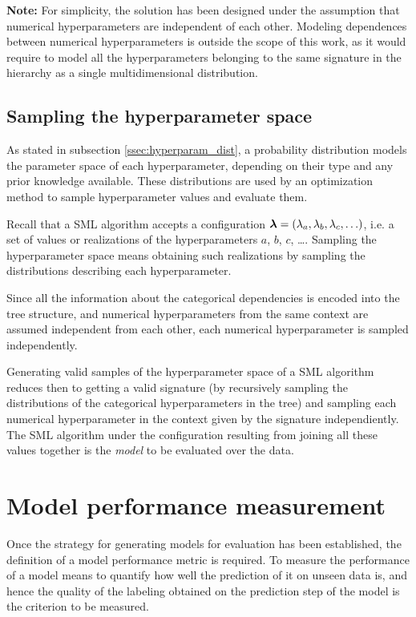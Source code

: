 	{\bf Note:} For simplicity, the solution has been designed under the assumption that numerical
	hyperparameters are independent of each other. Modeling dependences between numerical
	hyperparameters is outside the scope of this work, as it would require to model all the
	hyperparameters belonging to the same signature in the hierarchy as a single multidimensional
	distribution.

	\subsection{Sampling the hyperparameter space}
	\label{ssec:sampling}
	As stated in subsection \ref{ssec:hyperparam_dist}, a probability distribution models the
	parameter space of each hyperparameter, depending on their type and any prior knowledge
	available. These distributions are used by an optimization method to sample hyperparameter
	values and evaluate them.

	Recall that a SML algorithm accepts a configuration $\boldsymbol{\lambda} = (\lambda_a, \lambda_b,
	\lambda_c, \ldots)$, i.e. a set of values or realizations of the hyperparameters $a$, $b$,
	$c$, \ldots. Sampling the hyperparameter space means obtaining such realizations by
	sampling the distributions describing each hyperparameter.

	Since all the information about the categorical dependencies is encoded into the tree structure,
	and numerical hyperparameters from the same context are assumed independent from each other, each
	numerical hyperparameter is sampled independently.
	
	Generating valid samples of the hyperparameter space of a SML algorithm reduces then to getting
	a valid signature (by recursively sampling the distributions of the categorical hyperparameters
	in the tree) and sampling each numerical hyperparameter in the context given by the signature
	independiently. The SML algorithm under the configuration resulting from joining all these
	values together is the \emph{model} to be evaluated over the data.

\section{Model performance measurement}
	\label{sec:performance_measurement}
	
	Once the strategy for generating models for evaluation has been established, the definition of a
	model performance metric is required. To measure the performance of a model means to quantify
	how well the prediction of it on unseen data is, and hence the quality of the labeling obtained
	on the prediction step of the model is the criterion to be measured.

